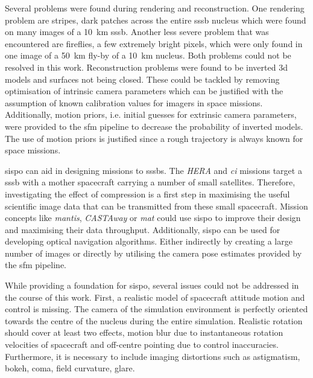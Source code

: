 Several problems were found during rendering and reconstruction. One rendering problem are stripes, dark patches across the entire \gls{sssb} nucleus which were found on many images of a \SI{10}{\kilo\meter} \gls{sssb}. Another less severe problem that was encountered are  fireflies, a few extremely bright pixels, which were only found in one image of a \SI{50}{\kilo\meter} fly-by of a \SI{10}{\kilo\meter} nucleus. Both problems could not be resolved in this work.
Reconstruction problems were found to be inverted \gls{3d} models and surfaces not being closed. These could be tackled by removing optimisation of intrinsic camera parameters which can be justified with the assumption of known calibration values for imagers in space missions. Additionally, motion priors, i.e. initial guesses for extrinsic camera parameters, were provided to the \gls{sfm} pipeline to decrease the probability of inverted models. The use of motion priors is justified since a rough trajectory is always known for space missions.

\Gls{sispo} can aid in designing missions to \glspl{sssb}. The \textit{HERA} and \textit{\gls{ci}} missions target a \gls{sssb} with a mother spacecraft carrying a number of small satellites. Therefore, investigating the effect of compression is a first step in maximising the useful scientific image data that can be transmitted from these small spacecraft. Mission concepts like \textit{\gls{mantis}}, \textit{CASTAway} or \textit{\gls{mat}} could use \gls{sispo} to improve their design and maximising their data throughput. Additionally, \gls{sispo} can be used for developing optical navigation algorithms. Either indirectly by creating a large number of images or directly by utilising the camera pose estimates provided by the \gls{sfm} pipeline.

While providing a foundation for \gls{sispo}, several issues could not be addressed in the course of this work. First, a realistic model of spacecraft attitude motion and control is missing. The camera of the simulation environment is perfectly oriented towards the centre of the nucleus during the entire simulation. Realistic rotation should cover at least two effects, motion blur due to instantaneous rotation velocities of spacecraft and off-centre pointing due to control inaccuracies. Furthermore, it is necessary to include imaging distortions such as astigmatism, bokeh, coma, field curvature, glare.

